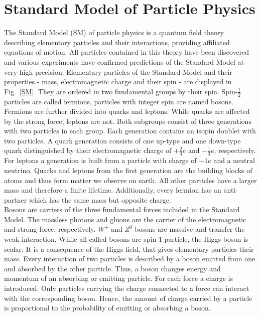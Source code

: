 \section{Standard Model of Particle Physics}
	The Standard Model (SM) of particle physics is a quantum field theory describing elementary particles and their interactions, providing affiliated equations of motion. All particles contained in this theory have been discovered and various experiments have confirmed predictions of the Standard Model at very high precision. Elementary particles of the Standard Model and their properties - mass, electromagnetic charge and their spin - are displayed in Fig.~\ref{SM}. They are ordered in two fundamental groups by their spin. Spin-$\frac{1}{2}$ particles are called fermions, particles with integer spin are named bosons. 
	\\
	Fermions are further divided into quarks and leptons. While quarks are affected by the strong force, leptons are not. Both subgroups consist of three generations with two particles in each group. Each generation contains an isopin doublet with two particles. A quark generation consists of one up-type and one down-type quark distinguished by their electromagnetic charge of $+\frac{2}{3}e$ and $-\frac{1}{3}e$, respectively. For leptons a generation is built from a particle with charge of $-1e$ and a neutral neutrino. Quarks and leptons from the first generation are the building blocks of atoms and thus form matter we observe on earth. All other particles have a larger mass and therefore a finite lifetime. Additionally, every fermion has an anti-partner which has the same mass but opposite charge. 
	\\	
	Bosons are carriers of the three fundamental forces included in the Standard Model. The massless photons and gluons are the carrier of the electromagnetic and strong force, respectively. $W^\pm$ and $Z^0$ bosons are massive and transfer the weak interaction. While all called bosons are spin-$1$ particle, the Higgs boson is scalar. It is a consequence of the Higgs field, that gives elementary particles their mass. Every interaction of two particles is described by a boson emitted from one and absorbed by the other particle. Thus, a boson changes energy and momentum of an absorbing or emitting particle. For each force a charge is introduced. Only particles carrying the charge connected to a force can interact with the corresponding boson. Hence, the amount of charge carried by a particle is proportional to the probability of emitting or absorbing a boson. 
	\\
